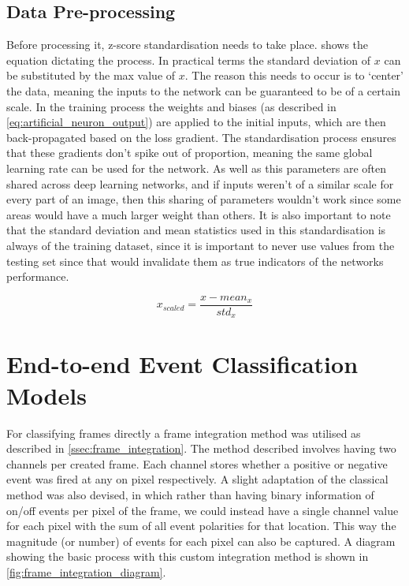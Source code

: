 \subsection{Data Pre-processing} \label{ssec:data_preprocessing_design}

Before processing it, z-score standardisation needs to take place.  shows the equation dictating the process. In practical terms the standard deviation of $ x $ can be substituted by the max value of $ x $. The reason this needs to occur is to `center' the data, meaning the inputs to the network can be guaranteed to be of a certain scale. In the training process the weights and biases (as described in \cref{eq:artificial_neuron_output}) are applied to the initial inputs, which are then back-propagated based on the loss gradient. The standardisation process ensures that these gradients don't spike out of proportion, meaning the same global learning rate can be used for the network. As well as this parameters are often shared across deep learning networks, and if inputs weren't of a similar scale for every part of an image, then this sharing of parameters wouldn't work since some areas would have a much larger weight than others. It is also important to note that the standard deviation and mean statistics used in this standardisation is always of the training dataset, since it is important to never use values from the testing set since that would invalidate them as true indicators of the networks performance.

\begin{equation}
    x_{scaled} = \frac{x - mean_x}{std_x}
    \label{eq:z_score}
\end{equation}

\section{End-to-end Event Classification Models}

For classifying frames directly a frame integration method was utilised as described in \cref{ssec:frame_integration}. The method described involves having two channels per created frame. Each channel stores whether a positive or negative event was fired at any on pixel respectively. A slight adaptation of the classical method was also devised, in which rather than having binary information of on/off events per pixel of the frame, we could instead have a single channel value for each pixel with the sum of all event polarities for that location. This way the magnitude (or number) of events for each pixel can also be captured. A diagram showing the basic process with this custom integration method is shown in \cref{fig:frame_integration_diagram}.

